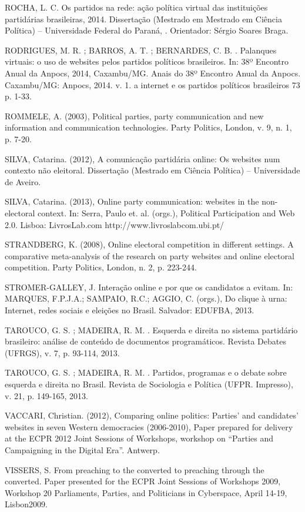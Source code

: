ROCHA, L. C. Os partidos na rede: ação política virtual das instituições
partidárias brasileiras, 2014. Dissertação (Mestrado em Mestrado em
Ciência Política) -- Universidade Federal do Paraná, . Orientador:
Sérgio Soares Braga.

RODRIGUES, M. R. ; BARROS, A. T. ; BERNARDES, C. B. . Palanques
virtuais: o uso de websites pelos partidos políticos brasileiros. In:
38º Encontro Anual da Anpocs, 2014, Caxambu/MG. Anais do 38º Encontro
Anual da Anpocs. Caxambu/MG: Anpocs, 2014. v. 1. a internet e os
partidos políticos brasileiros 73 p. 1-33.

ROMMELE, A. (2003), Political parties, party communication and new
information and communication technologies. Party Politics, London, v.
9, n. 1, p. 7-20.

SILVA, Catarina. (2012), A comunicação partidária online: Os websites
num contexto não eleitoral. Dissertação (Mestrado em Ciência Política)
-- Universidade de Aveiro.

SILVA, Catarina. (2013), Online party communication: websites in the
non-electoral context. In: Serra, Paulo et. al. (orgs.), Political
Participation and Web 2.0. Lisboa: LivrosLab.com
http://www.livroslabcom.ubi.pt/

STRANDBERG, K. (2008), Online electoral competition in different
settings. A comparative meta-analysis of the research on party websites
and online electoral competition. Party Politics, London, n. 2, p.
223-244.

STROMER-GALLEY, J. Interação online e por que os candidatos a evitam.
In: MARQUES, F.P.J.A.; SAMPAIO, R.C.; AGGIO, C. (orgs.), Do clique à
urna: Internet, redes sociais e eleições no Brasil. Salvador: EDUFBA,
2013.

TAROUCO, G. S. ; MADEIRA, R. M. . Esquerda e direita no sistema
partidário brasileiro: análise de conteúdo de documentos programáticos.
Revista Debates (UFRGS), v. 7, p. 93-114, 2013.

TAROUCO, G. S. ; MADEIRA, R. M. . Partidos, programas e o debate sobre
esquerda e direita no Brasil. Revista de Sociologia e Política (UFPR.
Impresso), v. 21, p. 149-165, 2013.

VACCARI, Christian. (2012), Comparing online politics: Parties' and
candidates' websites in seven Western democracies (2006-2010), Paper
prepared for delivery at the ECPR 2012 Joint Sessions of Workshops,
workshop on ``Parties and Campaigning in the Digital Era''. Antwerp.

VISSERS, S. From preaching to the converted to preaching through the
converted. Paper presented for the ECPR Joint Sessions of Workshops
2009, Workshop 20 Parliaments, Parties, and Politicians in Cyberspace,
April 14-19, Lisbon2009.

